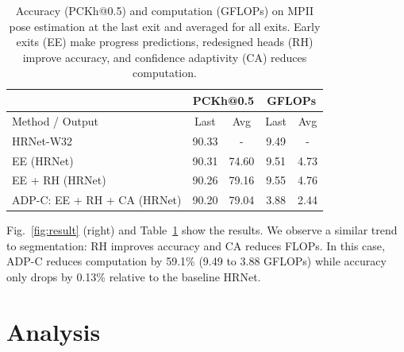 \documentclass{article} %
\renewcommand{\cite}{\citep}
\begin{document}
\setlength{\tabcolsep}{4pt}
\renewcommand{\arraystretch}{1.2}
\begin{table}[h]
\centering
\small
\vspace{-1ex}
\begin{tabular}{l|cc|cc}
\hline
                        & \multicolumn{2}{c|}{PCKh@0.5} & \multicolumn{2}{c}{GFLOPs} \\ \hline
Method / Output         & Last                & Avg                & Last                & Avg                \\ \hline
HRNet-W32 \cite{wang2020deep}     & 90.33               & -                  & 9.49                & -                  \\ \hline
EE (HRNet)          & 90.31               & 74.60               & 9.51                & 4.73               \\ \hline
EE + RH (HRNet)    & 90.26               & 79.16              & 9.55                & 4.76               \\
ADP-C: EE + RH + CA (HRNet) & 90.20               & 79.04              & 3.88                & 2.44               \\ \hline
\end{tabular}
\vspace{-1ex}
\caption{%
Accuracy (PCKh@0.5) and computation (GFLOPs) on MPII pose estimation at the last exit and averaged for all exits.
Early exits (EE) make progress predictions, redesigned heads (RH) improve accuracy, and confidence adaptivity (CA) reduces computation.
}
\vspace{-1ex}
\label{tab:pose}
\end{table}
 
Fig.~\ref{fig:result} (right) and Table~\ref{tab:pose} show the results.
We observe a similar trend to segmentation: RH improves accuracy and CA reduces FLOPs.
In this case, ADP-C reduces computation by 59.1\% (9.49 to 3.88 GFLOPs) while accuracy only drops by 0.13\% relative to the baseline HRNet. 


\section{Analysis}
\label{sec:analysis}
\end{document}
